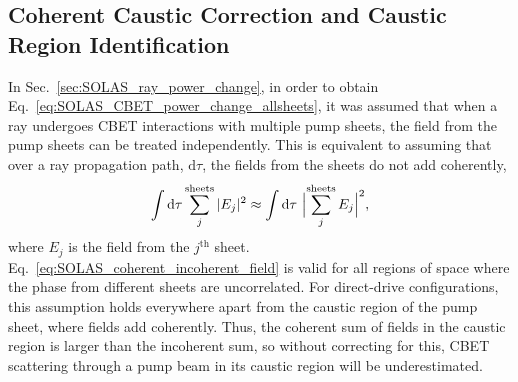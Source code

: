 \subsection{Coherent Caustic Correction and Caustic Region Identification}%
\label{sec:SOLAS_coherent_caustic}

In Sec.~\ref{sec:SOLAS_ray_power_change}, in order to obtain Eq.~\ref{eq:SOLAS_CBET_power_change_allsheets}, it was assumed that when a ray undergoes \ac{CBET} interactions with multiple pump sheets, the field from the pump sheets can be treated independently.
This is equivalent to assuming that over a ray propagation path, $\text{d}\tau$, the fields from the sheets do not add coherently,
\begin{equation}
    \label{eq:SOLAS_coherent_incoherent_field}
    \int\text{d}\tau \sum_{j}^{\text{sheets}} |E_j|^2 \approx \int\text{d}\tau \ \Bigl| \sum_{j}^{\text{sheets}} E_j \Bigr|^2,
\end{equation}
where $E_j$ is the field from the $j^{\text{th}}$ sheet.
Eq.~\ref{eq:SOLAS_coherent_incoherent_field} is valid for all regions of space where the phase from different sheets are uncorrelated.
For direct-drive configurations, this assumption holds everywhere apart from the caustic region of the pump sheet, where fields add coherently.
Thus, the coherent sum of fields in the caustic region is larger than the incoherent sum, so without correcting for this, \ac{CBET} scattering through a pump beam in its caustic region will be underestimated.

